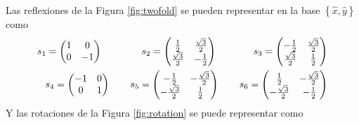 Las reflexiones de la Figura \ref{fig:twofold} se pueden representar en la base $\left\{\hat{x},\hat{y}\right\}$ como 
\begin{align}
  \begin{split}
    s_1 = \begin{pmatrix}
  1 & 0\\
  0 & -1
  \end{pmatrix}\hspace{1.4cm}s_2 = \begin{pmatrix}
      \frac{1}{2} & \frac{\sqrt{3}}{2}\\
      \frac{\sqrt{3}}{2} & -\frac{1}{2}
      \end{pmatrix} \hspace{1.3cm} s_3 = \begin{pmatrix}
      -\frac{1}{2} & \frac{\sqrt{3}}{2} \\
\frac{\sqrt{3}}{2} & \frac{1}{2}
    \end{pmatrix}\\
     s_4 = \begin{pmatrix}
    -1 & 0\\
    0 & 1
  \end{pmatrix}\hspace{0.7cm} s_5 = \begin{pmatrix}
    -\frac{1}{2} & -\frac{\sqrt{3}}{2} \\
    -\frac{\sqrt{3}}{2} & \frac{1}{2}
  \end{pmatrix} \hspace{0.7cm} s_6 = \begin{pmatrix}
  \frac{1}{2} & -\frac{\sqrt{3}}{2} \\
  -\frac{\sqrt{3}}{2} & -\frac{1}{2}
  \end{pmatrix}
   \end{split}
\end{align}
Y las rotaciones de la Figura \ref{fig:rotation} se puede representar como
